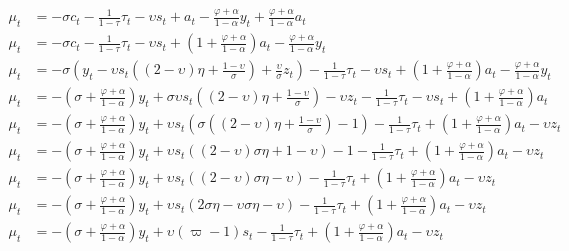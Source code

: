 \begin{align}
   \mu_t &= -\sigma c_t - \frac{1}{1-\tau}\tau_t - \upsilon s_t + a_t -\frac{\varphi + \alpha}{1-\alpha}y_t + \frac{\varphi + \alpha}{1-\alpha}a_t\\
   \mu_t &= -\sigma c_t - \frac{1}{1-\tau}\tau_t - \upsilon s_t + \left(1 + \frac{\varphi + \alpha}{1-\alpha}\right)a_t -\frac{\varphi + \alpha}{1-\alpha}y_t \\
   \mu_t &= -\sigma \left(y_t - \upsilon s_t \left( (2-\upsilon)\eta + \frac{1-\upsilon}{\sigma}\right) + \frac{\upsilon}{\sigma}z_t\right) - \frac{1}{1-\tau}\tau_t - \upsilon s_t + \left(1 + \frac{\varphi + \alpha}{1-\alpha}\right)a_t -\frac{\varphi + \alpha}{1-\alpha}y_t \\
   \mu_t &= -\left(\sigma + \frac{\varphi + \alpha}{1-\alpha}\right)y_t + \sigma \upsilon s_t \left( (2-\upsilon)\eta + \frac{1-\upsilon}{\sigma}\right) - \upsilon z_t- \frac{1}{1-\tau}\tau_t - \upsilon s_t + \left(1 + \frac{\varphi + \alpha}{1-\alpha}\right)a_t \\
   \mu_t &= -\left(\sigma + \frac{\varphi + \alpha}{1-\alpha}\right)y_t + \upsilon s_t \left(\sigma  \left( (2-\upsilon)\eta + \frac{1-\upsilon}{\sigma}\right)- 1 \right) - \frac{1}{1-\tau}\tau_t  + \left(1 + \frac{\varphi + \alpha}{1-\alpha}\right)a_t - \upsilon z_t\\
   \mu_t &= -\left(\sigma + \frac{\varphi + \alpha}{1-\alpha}\right)y_t + \upsilon s_t \left( (2-\upsilon)\sigma \eta + {1-\upsilon}\right)- 1 - \frac{1}{1-\tau}\tau_t  + \left(1 + \frac{\varphi + \alpha}{1-\alpha}\right)a_t - \upsilon z_t\\
   \mu_t &= -\left(\sigma + \frac{\varphi + \alpha}{1-\alpha}\right)y_t + \upsilon s_t \left( (2-\upsilon)\sigma \eta -\upsilon\right) - \frac{1}{1-\tau}\tau_t  + \left(1 + \frac{\varphi + \alpha}{1-\alpha}\right)a_t - \upsilon z_t\\
   \mu_t &= -\left(\sigma + \frac{\varphi + \alpha}{1-\alpha}\right)y_t + \upsilon s_t \left( 2\sigma \eta-\upsilon\sigma \eta -\upsilon\right) - \frac{1}{1-\tau}\tau_t  + \left(1 + \frac{\varphi + \alpha}{1-\alpha}\right)a_t - \upsilon z_t\\
   \mu_t &= -\left(\sigma + \frac{\varphi + \alpha}{1-\alpha}\right)y_t + \upsilon (\varpi - 1) s_t - \frac{1}{1-\tau}\tau_t  + \left(1 + \frac{\varphi + \alpha}{1-\alpha}\right)a_t - \upsilon z_t \label{eq:appendix_average_markup_end}
\end{align}